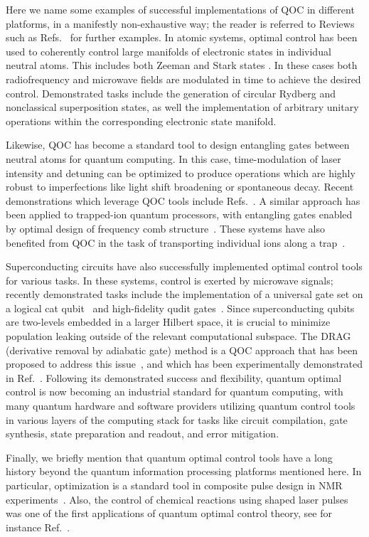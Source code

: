 Here we name some examples of successful implementations of QOC in different platforms, in a manifestly non-exhaustive way; the reader is referred to Reviews such as Refs.~\cite{Glaser2015,Koch2022} for further examples. In atomic systems, optimal control has been used to coherently control large manifolds of electronic states in individual neutral atoms. This includes both Zeeman \cite{smith2013,anderson2015,lysne2020} and Stark states \cite{larrouy2020}. In these cases both radiofrequency and microwave fields are modulated in time to achieve the desired control. Demonstrated tasks include the generation of circular Rydberg and nonclassical superposition states, as well the implementation of arbitrary unitary operations within the corresponding electronic state manifold.

Likewise, QOC has become a standard tool to design entangling gates between neutral atoms for quantum computing. In this case, time-modulation of laser intensity and detuning can be optimized to produce operations which are highly robust to imperfections like light shift broadening or spontaneous decay. Recent demonstrations which leverage QOC tools include Refs.~\cite{omran2019,evered2023,cao2024}. A similar approach has been applied to trapped-ion quantum processors, with entangling gates enabled by optimal design of frequency comb structure~\cite{choi2014}. These systems have also benefited from QOC in the task of transporting individual ions along a trap~\cite{sterk2022}.

Superconducting circuits have also successfully implemented optimal control tools for various tasks. In these systems, control is exerted by microwave signals; recently demonstrated tasks include the implementation of a universal gate set on a logical cat qubit~\cite{heeres2017} and high-fidelity qudit gates~\cite{seifert2023}. Since superconducting qubits are two-levels embedded in a larger Hilbert space, it is crucial to minimize population leaking outside of the relevant computational subspace. The DRAG (derivative removal by adiabatic gate) method is a QOC approach that has been proposed to address this issue~\cite{motzoi2009}, and which has been experimentally demonstrated in Ref.~\cite{werninghaus2021}. Following its demonstrated success and flexibility, quantum optimal control is now becoming an industrial standard for quantum computing, with many quantum hardware and software providers utilizing quantum control tools in various layers of the computing stack for tasks like circuit compilation, gate synthesis, state preparation and readout, and error mitigation.

Finally, we briefly mention that quantum optimal control tools have a long history beyond the quantum information processing platforms mentioned here. In particular, optimization is a standard tool in composite pulse design in NMR experiments~\cite{bonnard2012}. Also, the control of chemical reactions using shaped laser pulses was one of the first applications of quantum optimal control theory, see for instance Ref.~\cite{tannor1985}.

